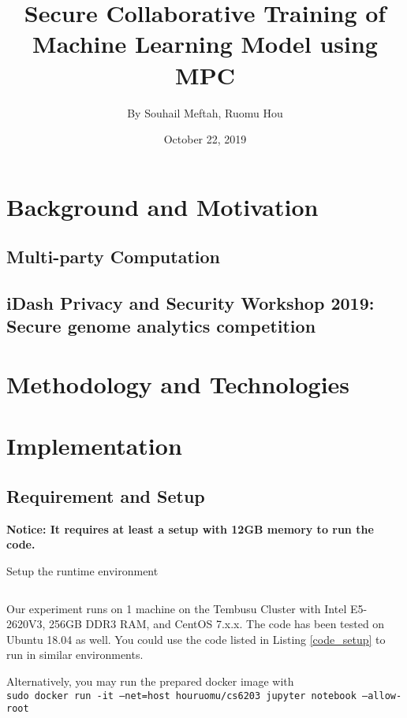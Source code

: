 \documentclass[a4paper,12pt]{article}
\begin{document}
\title{\Large{\textbf{Secure Collaborative Training of Machine Learning Model using MPC}}}
\author{By Souhail Meftah, Ruomu Hou}
\date{October 22, 2019}
\maketitle
\let\cleardoublepage\clearpage
\setcounter{page}{1}
\fancyhf{}



\section{Background and Motivation}

\subsection{Multi-party Computation}

\subsection{iDash Privacy and Security Workshop 2019: Secure genome analytics competition}

\section{Methodology and Technologies}

\section{Implementation}
\subsection{Requirement and Setup}
\textbf{Notice: It requires at least a setup with 12GB memory to run the code.}

\begin{listing}[H]
	\caption{Setup the runtime environment}
	\inputminted[frame=single,framesep=10pt,linenos]{bash}{1_prep.sh}
	\label{code_setup}
\end{listing}

Our experiment runs on 1 machine on the Tembusu Cluster with Intel E5-2620V3, 256GB DDR3 RAM, and CentOS 7.x.x. The code has been tested on Ubuntu 18.04 as well. You could use the code listed in Listing \ref{code_setup} to run in similar environments.  

Alternatively, you may run the prepared docker image with\\
\texttt{sudo docker run -it --net=host houruomu/cs6203 jupyter notebook --allow-root}
\end{document}
